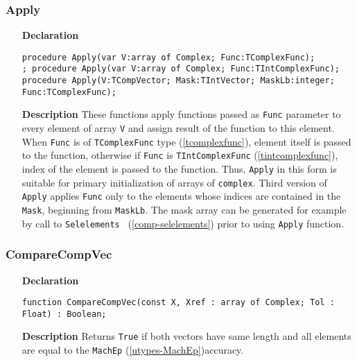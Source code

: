 \documentclass[12pt,a4paper,oneside]{report}
\newcommand{\declarationitem}[1]{\textbf{#1}}
\newcommand{\descriptiontitle}[1]{\textbf{#1}}
\newcommand{\code}[1]{\texttt{#1}}
\begin{document}
\subsubsection{Apply}
\label{comp-apply}
\begin{itemize}
	\item[\declarationitem{Declaration}\hfill]
	\begin{flushleft}
\code{procedure Apply(var V:array of Complex; Func:TComplexFunc); \\;
procedure Apply(var V:array of Complex; Func:TIntComplexFunc);\\
procedure Apply(V:TCompVector; Mask:TIntVector; MaskLb:integer; Func:TComplexFunc);}
\end{flushleft}
	\item[\descriptiontitle{Description}]
	These functions apply functions passed as \code{Func} parameter to every element of array \code{V} and assign result of the function to this element. When \code{Func} is of \code{TComplexFunc} type (\ref{tcomplexfunc}), element itself is passed to the function, otherwise if \code{Func} is \code{TIntComplexFunc} (\ref{tintcomplexfunc}), index of the element is passed to the function. Thus, \code{Apply} in this form is suitable for primary initialization of arrays of \code{complex}. Third version of \code{Apply} applies \code{Func} only to the elements whose indices are contained in the \code{Mask}, beginning from \code{MaskLb}. The mask array can be generated for example by call to \code{Selelements } (\ref{comp-selelements}) prior to using \code{Apply} function.
\end{itemize}	
\subsubsection{CompareCompVec}
\label{comparecompvec}
\begin{itemize}
	\item[\declarationitem{Declaration}\hfill]
	\begin{flushleft}
\code{function CompareCompVec(const X, Xref : array of Complex; Tol : Float) : Boolean;}		
	\end{flushleft}
	\item[\descriptiontitle{Description}]
	Returns \code{True} if both vectors have same length and all elements are equal to the \code{MachEp} (\ref{utypes-MachEp})accuracy.
\end{itemize}	
\end{document}
